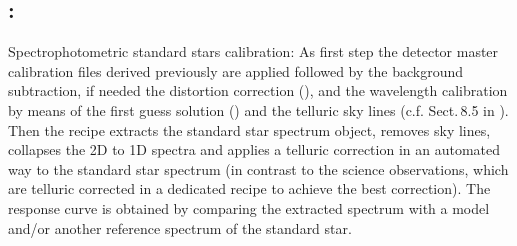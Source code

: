 % 

\subsection{:}
Spectrophotometric standard stars calibration: As first step the detector master calibration files derived previously are applied followed by the background subtraction, if needed the distortion correction (), and 
the wavelength calibration by means of the first guess solution () and the telluric sky lines (c.f. Sect.\,8.5 in \cite{DRLS}). Then the recipe extracts the standard star spectrum object, removes sky lines, collapses the 2D to 1D spectra and applies a telluric correction in an automated way to the standard star spectrum (in contrast to the science observations, which are telluric corrected in a dedicated recipe to achieve the best correction). The response curve is obtained by comparing the extracted spectrum with a model and/or another reference spectrum of the
standard star.
